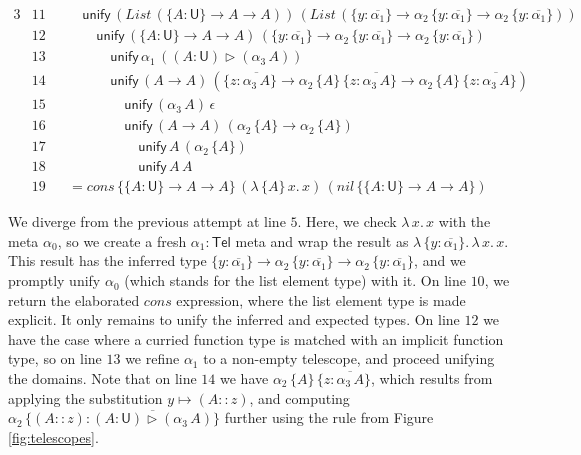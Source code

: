 \documentclass[acmsmall,screen,dvipsnames]{acmart}\settopmatter{}
\renewcommand{\U}{\mathsf{U}}
\newcommand{\unify}{\mathsf{unify}}
\newcommand{\mi}[1]{\mathit{#1}}
\newcommand{\Tel}{\mathsf{Tel}}
\newcommand{\TCons}{\triangleright}
\newcommand{\ol}[1]{\overline{#1}}
\theoremstyle{remark}
\begin{document}
\begin{example}
\begin{alignat*}{3}
  & \scriptstyle{11} && \quad \unify\,(\mi{List}\,(\{A : \U\}\to A \to A))\,(\mi{List}\,(\{y : \ol{\alpha_1}\} \to \alpha_2\,\{y : \ol{\alpha_1}\}\to \alpha_2\,\{y : \ol{\alpha_1}\}))\\
  & \scriptstyle{12} && \qquad \unify\,(\{A : \U\}\to A \to A)\,(\{y : \ol{\alpha_1}\} \to \alpha_2\,\{y : \ol{\alpha_1}\}\to \alpha_2\,\{y : \ol{\alpha_1}\})\\
  & \scriptstyle{13} && \qquad\quad \unify\,\alpha_1\,((A : \U) \TCons (\alpha_3\,A))\\
  & \scriptstyle{14} && \qquad \quad \unify\,(A \to A)\,(\{z : \ol{\alpha_3\,A}\} \to \alpha_2\,\{A\}\,\{z : \ol{\alpha_3\,A}\}\to \alpha_2\,\{A\}\,\{z : \ol{\alpha_3\,A}\})\\
  & \scriptstyle{15} && \qquad \qquad \unify\,(\alpha_3\,A)\,\epsilon\\
  & \scriptstyle{16} && \qquad \qquad \unify\,(A \to A)\,(\alpha_2\,\{A\} \to \alpha_2\,\{A\})\\
  & \scriptstyle{17} && \qquad \qquad \quad \unify\,A\,(\alpha_2\,\{A\})\\
  & \scriptstyle{18} && \qquad \qquad \quad \unify\,A\, A\\
  & \scriptstyle{19} && = \mi{cons}\,\{\{A : \U\}\to A \to A\}\,(\lambda\,\{A\}\,x.\,x)\,(\mi{nil}\,\{\{A : \U\}\to A \to A\})
\end{alignat*}
\endgroup

We diverge from the previous attempt at line $\scriptstyle{5}$. Here, we check
$\lambda\,x.\,x$ with the meta $\alpha_0$, so we create a fresh $\alpha_1 :
\Tel$ meta and wrap the result as $\lambda\,\{y :
\ol{\alpha_1}\}.\,\lambda\,x.\,x$. This result has the inferred type $\{y :
\ol{\alpha_1}\} \to \alpha_2\,\{y : \ol{\alpha_1}\}\to \alpha_2\,\{y :
\ol{\alpha_1}\}$, and we promptly unify $\alpha_0$ (which stands for the list
element type) with it. On line $\scriptstyle{10}$, we return the elaborated
$\mi{cons}$ expression, where the list element type is made explicit. It only remains
to unify the inferred and expected types. On line $\scriptstyle{12}$ we have the
case where a curried function type is matched with an implicit function type, so
on line $\scriptstyle{13}$ we refine $\alpha_1$ to a non-empty telescope, and
proceed unifying the domains. Note that on line $\scriptstyle{14}$ we have
$\alpha_2\,\{A\}\,\{z : \ol{\alpha_3\,A}\}$, which results from applying the
substitution $y \mapsto (A :: z)$, and computing $\alpha_2\,\{(A :: z) : \ol{(A :
  \U) \TCons (\alpha_3\,A)}\}$ further using the \LabTirName{app-$\TCons$} rule
from Figure \ref{fig:telescopes}.


\end{example}
\end{document}
